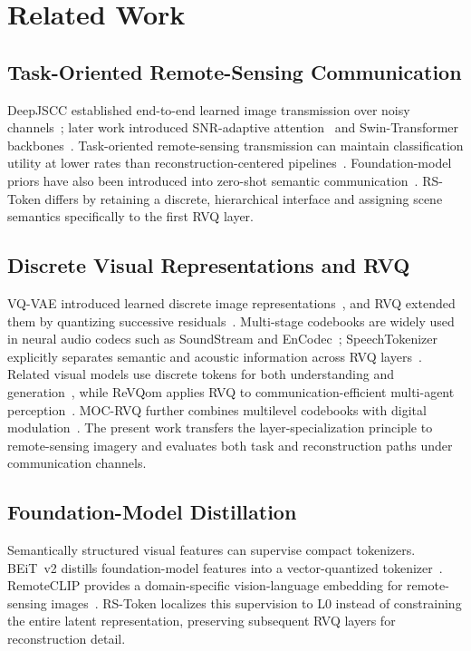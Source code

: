 \documentclass[letterpaper,journal]{IEEEtran}
\begin{document}
\section{Related Work}

\subsection{Task-Oriented Remote-Sensing Communication}
DeepJSCC established end-to-end learned image transmission over noisy channels~\cite{deepjscc}; later work introduced SNR-adaptive attention~\cite{xu2022adjscc} and Swin-Transformer backbones~\cite{yang2024swinjscc}. Task-oriented remote-sensing transmission can maintain classification utility at lower rates than reconstruction-centered pipelines~\cite{gao2022task}. Foundation-model priors have also been introduced into zero-shot semantic communication~\cite{semclip}. RS-Token differs by retaining a discrete, hierarchical interface and assigning scene semantics specifically to the first RVQ layer.

\subsection{Discrete Visual Representations and RVQ}
VQ-VAE introduced learned discrete image representations~\cite{vqvae}, and RVQ extended them by quantizing successive residuals~\cite{lee2022residual}. Multi-stage codebooks are widely used in neural audio codecs such as SoundStream and EnCodec~\cite{soundstream,encodec}; SpeechTokenizer explicitly separates semantic and acoustic information across RVQ layers~\cite{zhang2024speechtokenizer}. Related visual models use discrete tokens for both understanding and generation~\cite{vilau}, while ReVQom applies RVQ to communication-efficient multi-agent perception~\cite{revqom}. MOC-RVQ further combines multilevel codebooks with digital modulation~\cite{moc-rvq}. The present work transfers the layer-specialization principle to remote-sensing imagery and evaluates both task and reconstruction paths under communication channels.

\subsection{Foundation-Model Distillation}
Semantically structured visual features can supervise compact tokenizers. BEiT~v2 distills foundation-model features into a vector-quantized tokenizer~\cite{beitv2}. RemoteCLIP provides a domain-specific vision-language embedding for remote-sensing images~\cite{liu2024remoteclip}. RS-Token localizes this supervision to L0 instead of constraining the entire latent representation, preserving subsequent RVQ layers for reconstruction detail.
\end{document}

